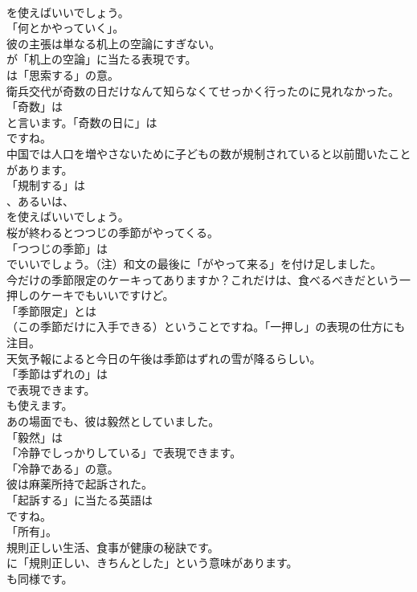 \documentclass[8pt]{extreport}
\begin{document}
\begin{CJK}{UTF8}{min}
\\	を使えばいいでしょう。
\\	「何とかやっていく」。	
\\	彼の主張は単なる机上の空論にすぎない。 
\\	が「机上の空論」に当たる表現です。
\\	は「思索する」の意。	
\\	衛兵交代が奇数の日だけなんて知らなくてせっかく行ったのに見れなかった。 
\\	「奇数」は
\\	と言います。「奇数の日に」は
\\	ですね。	
\\	中国では人口を増やさないために子どもの数が規制されていると以前聞いたことがあります。 
\\	「規制する」は 
\\	、あるいは、
\\	を使えばいいでしょう。	
\\	桜が終わるとつつじの季節がやってくる。 
\\	「つつじの季節」は
\\	でいいでしょう。（注）和文の最後に「がやって来る」を付け足しました。	
\\	今だけの季節限定のケーキってありますか？これだけは、食べるべきだという一押しのケーキでもいいですけど。 
\\	「季節限定」とは 
\\	（この季節だけに入手できる）ということですね。「一押し」の表現の仕方にも注目。	
\\	天気予報によると今日の午後は季節はずれの雪が降るらしい。 
\\	「季節はずれの」は 
\\	で表現できます。
\\	も使えます。	
\\	あの場面でも、彼は毅然としていました。 
\\	「毅然」は
\\	「冷静でしっかりしている」で表現できます。
\\	「冷静である」の意。	
\\	彼は麻薬所持で起訴された。 
\\	「起訴する」に当たる英語は
\\	ですね。
\\	「所有」。	
\\	規則正しい生活、食事が健康の秘訣です。 
\\	に「規則正しい、きちんとした」という意味があります。
\\	も同様です。	

\end{CJK}
\end{document}

